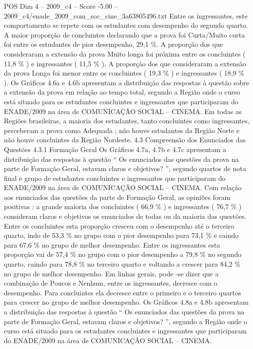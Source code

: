 \begin{textsample}{POS Dim 4 – 2009\_c4 – Score -5.00 – 2009\_c4/enade\_2009\_com\_soc\_cine\_3a63805496.txt}
Entre os ingressantes, este comportamento se repete com os estudantes com desempenho do segundo quarto.
A maior proporção de concluintes declarando que a prova foi Curta/Muito curta foi entre os estudantes de pior desempenho, 29,1 \%.
A proporção dos que consideraram a extensão da prova Muito longa foi próxima entre os concluintes ( 11,8 \% ) e ingressantes ( 11,5 \% ).
A proporção dos que consideraram a extensão da prova Longa foi menor entre os concluintes ( 19,3 \% ) e ingressantes ( 18,9 \% ).
Os Gráficos 4.6a e 4.6b apresentam a distribuição das respostas à questão sobre a extensão da prova em relação ao tempo total, segundo a Região onde o curso está situado para os estudantes concluintes e ingressantes que participaram do ENADE/2009 na área de COMUNICAÇÃO SOCIAL – CINEMA.
Em todas as Regiões brasileiras, a maioria dos estudantes, tanto concluintes como ingressantes, perceberam a prova como Adequada ; não houve estudantes da Região Norte e não houve concluintes da Região Nordeste. 4.3 Compreensão dos Enunciados das Questões 4.3.1 Formação Geral Os Gráficos 4.7a, 4.7b e 4.7c apresentam a distribuição das respostas à questão “ Os enunciados das questões da prova na parte de Formação Geral, estavam claros e objetivos? ”, segundo quartos de nota final e grupo de estudantes concluintes e ingressantes que participaram do ENADE/2009 na área de COMUNICAÇÃO SOCIAL – CINEMA.
Com relação aos enunciados das questões da parte de Formação Geral, as opiniões foram positivas : a grande maioria dos concluintes ( 66,9 \% ) e ingressantes ( 76,7 \% ) consideram claros e objetivos os enunciados de todas ou da maioria das questões.
Entre os concluintes esta proporção cresceu com o desempenho até o terceiro quarto, indo de 53,3 \% no grupo com o pior desempenho para 73,1 \% e caindo para 67,6 \% no grupo de melhor desempenho.
Entre os ingressantes esta proporção vai de 57,4 \% no grupo com o pior desempenho a 79,8 \% no segundo quarto, caindo para 78,8 \% no terceiro quarto e voltando a crescer para 84,2 \% no grupo de melhor desempenho.
Em linhas gerais, pode -se dizer que a combinação de Poucos e Nenhum, entre os ingressantes, decresce com o desempenho.
Para concluintes ela decresce entre o primeiro e o terceiro quartos para crescer no grupo de melhor desempenho.
Os Gráficos 4.8a e 4.8b apresentam a distribuição das respostas à questão “ Os enunciados das questões da prova na parte de Formação Geral, estavam claros e objetivos? ”, segundo a Região onde o curso está situado para os estudantes concluintes e ingressantes que participaram do ENADE/2009 na área de COMUNICAÇÃO SOCIAL – CINEMA.

\end{textsample}

